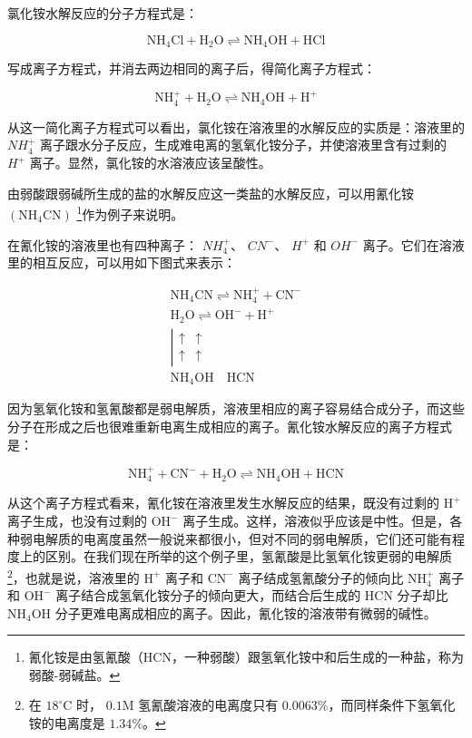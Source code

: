 氯化铵水解反应的分子方程式是：

\[
\mathrm{NH} _ {4} \mathrm{Cl} + \mathrm{H} _ {2} \mathrm{O} \rightleftharpoons \mathrm{NH} _ {4} \mathrm{OH} + \mathrm{HCl}
\]

写成离子方程式，并消去两边相同的离子后，得简化离子方程式：

\[
\mathrm{NH} _ {4} ^ {+} + \mathrm{H} _ {2} \mathrm{O} \rightleftharpoons \mathrm{NH} _ {4} \mathrm{OH} + \mathrm{H} ^ {+}
\]

从这一简化离子方程式可以看出，氯化铵在溶液里的水解反应的实质是：溶液里的
\(NH_{4}^{+}\)
离子跟水分子反应，生成难电离的氢氧化铵分子，并使溶液里含有过剩的
\(H^{+}\) 离子。显然，氯化铵的水溶液应该呈酸性。

由弱酸跟弱碱所生成的盐的水解反应这一类盐的水解反应，可以用氰化铵
\(\left(\mathrm{NH}_{4}\mathrm{CN}\right)\) \footnote{氰化铵是由氢氰酸（HCN，一种弱酸）跟氢氧化铵中和后生成的一种盐，称为弱酸-弱碱盐。}作为例子来说明。

在氰化铵的溶液里也有四种离子： \(NH_{4}^{+}\)、 \(CN^{-}\)、 \(H^{+}\)
和 \(OH^{-}\) 离子。它们在溶液里的相互反应，可以用如下图式来表示：

\[
\begin{array}{c} \mathrm{NH} _ {4} \mathrm{CN} \rightleftharpoons \mathrm{NH} _ {4} ^ {+} + \mathrm{CN} ^ {-} \\ \mathrm{H} _ {2} \mathrm{O} \rightleftharpoons \mathrm{OH} ^ {-} + \mathrm{H} ^ {+} \\ \left| \begin{array}{cc} \uparrow & \uparrow \\ \uparrow & \uparrow \end{array} \right. \\ \mathrm{NH} _ {4} \mathrm{OH} \quad \mathrm{HCN} \end{array}
\]

因为氢氧化铵和氢氰酸都是弱电解质，溶液里相应的离子容易结合成分子，而这些分子在形成之后也很难重新电离生成相应的离子。氰化铵水解反应的离子方程式是：

\[
\mathrm{NH} _ {4} ^ {+} + \mathrm{CN} ^ {-} + \mathrm{H} _ {2} \mathrm{O} \rightleftharpoons \mathrm{NH} _ {4} \mathrm{OH} + \mathrm{HCN}
\]

从这个离子方程式看来，氰化铵在溶液里发生水解反应的结果，既没有过剩的
\(\mathrm{H}^{+}\) 离子生成，也没有过剩的 \(\mathrm{OH}^{-}\)
离子生成。这样，溶液似乎应该是中性。但是，各种弱电解质的电离度虽然一般说来都很小，但对不同的弱电解质，它们还可能有程度上的区别。在我们现在所举的这个例子里，氢氰酸是比氢氧化铵更弱的电解质\footnote{在
  \(18^{\circ} \mathrm{C}\) 时， \(0.1 \mathrm{M}\)
  氢氰酸溶液的电离度只有 \(0.0063 \%\)，而同样条件下氢氧化铵的电离度是
  \(1.34 \%\)。}，也就是说，溶液里的 \(\mathrm{H}^{+}\) 离子和
\(\mathrm{CN}^{-}\) 离子结成氢氰酸分子的倾向比 \(\mathrm{NH}_{4}^{+}\)
离子和 \(\mathrm{OH}^{-}\)
离子结合成氢氧化铵分子的倾向更大，而结合后生成的 HCN 分子却比
\(\mathrm{NH}_{4}\mathrm{OH}\)
分子更难电离成相应的离子。因此，氰化铵的溶液带有微弱的碱性。

